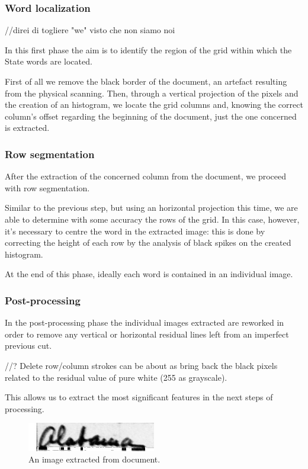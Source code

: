 \subsubsection{Word localization}
//direi di togliere "we" visto che non siamo noi

In this first phase the aim is to identify the region of the grid within which the State words are located. 

First of all we remove the black border of the document, an artefact resulting from the physical scanning. Then, through a vertical projection of the pixels and the creation of an histogram, we locate the grid columns and, knowing the correct column's offset regarding the beginning of the document, just the one concerned is extracted.

\subsubsection{Row segmentation}

After the extraction of the concerned column from the document, we proceed with row segmentation.

Similar to the previous step, but using an horizontal projection this time, we are able to determine with some accuracy the rows of the grid. In this case, however, it's necessary to centre the word in the extracted image: this is done by correcting the height of each row by the analysis of black spikes on the created histogram.

At the end of this phase, ideally each word is contained in an individual image.

\subsubsection{Post-processing}

In the post-processing phase the individual images extracted are reworked in order to remove any  vertical or horizontal residual lines left from an imperfect previous cut.

//?
Delete row/column strokes can be about as bring back the black pixels related to the residual value of pure white (255 as grayscale).

This allows us to extract the most significant features in the next steps of processing.

\begin{figure}[!ht]
\centering
\vspace{0.3cm}
\includegraphics[width=0.5\textwidth]{images/img2.jpg}
\caption{An image extracted from document.}
\label{fig:extracted_image}
\end{figure}

